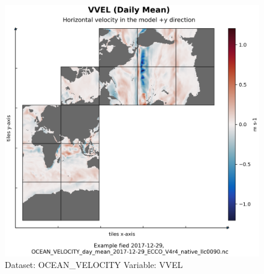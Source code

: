 \begin{longtable}{|p{}|p{}|p{}|p{}|}
\end{longtable}

\begin{figure}[H]
\centering
\includegraphics[width=\textwidth]{../images/plots/native_plots/Ocean_Velocity/VVEL.png}
\caption{Dataset: OCEAN\_VELOCITY Variable: VVEL}
\label{tab:table-OCEAN_VELOCITY_VVEL-Plot}
\end{figure}
\pagebreak
